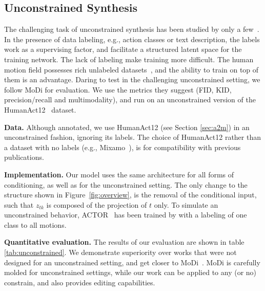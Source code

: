 \subsection{Unconstrained Synthesis} \label{sec:uncond}
\vspace{-5pt}
The challenging task of unconstrained synthesis has been studied by only a few~\citep{holden2016deep, raab2022modi}. 
In the presence of data labeling, e.g., action classes or text description, the labels work as a supervising factor, and facilitate a structured latent space for the training network. 
The lack of labeling make training more difficult.
The human motion field possesses rich unlabeled datasets~\citep{mixamo}, and the ability to train on top of them is an advantage.
Daring to test \ourmethod{} in the challenging unconstrained setting, we follow MoDi\citep{raab2022modi} for evaluation. We use the metrics they suggest (FID, KID, precision/recall and multimodality), and run on an unconstrained version of the HumanAct12~\citep{guo2020action2motion} dataset.

\textbf{Data.}
Although annotated, we use HumanAct12 (see Section \ref{sec:a2m}) in an unconstrained fashion, ignoring its labels. The choice of HumanAct12 rather than a dataset with no labels (e.g., Mixamo~\citep{mixamo}), is for compatibility with previous publications. 

\textbf{Implementation.}
Our model uses the same architecture for all forms of conditioning, as well as for the unconstrained setting.
The only change to the structure shown in Figure~\ref{fig:overview}, is the removal of the conditional input, such that $z_{tk}$ is composed of the projection of $t$ only.
To simulate an unconstrained behavior, ACTOR~\citet{petrovich21actor} has been trained by \citep{raab2022modi} with a labeling of one class to all motions.


\textbf{Quantitative evaluation.}
The results of our evaluation are shown in table \ref{tab:unconstrained}.
We demonstrate superiority over works that were not designed for an unconstrained setting, and get closer to MoDi~\citep{raab2022modi}. MoDi is carefully molded for unconstrained settings, while our work can be applied to any (or no) constrain, and also provides editing capabilities.



